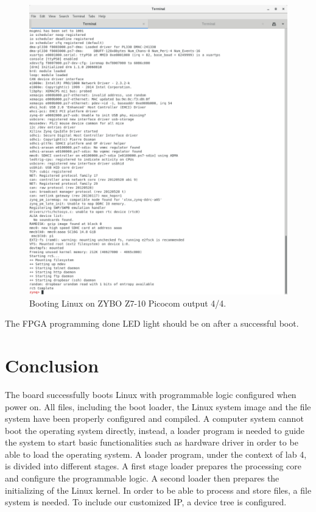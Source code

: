 \documentclass[11pt,letterpaper,titlepage]{article}
\begin{document}
\newpage

\begin{figure}[h!]
    \centering
    \includegraphics[width=\textwidth]{boot_4.png}
    \caption{Booting Linux on ZYBO Z7-10 Picocom output 4/4.}
\end{figure}

The FPGA programming done LED light should be on after a successful boot.

\newpage

\part{Conclusion}

The board successfully boots Linux with programmable logic configured when power on. All files, including the boot loader, the Linux system image and the file system have been properly configured and compiled. A computer system cannot boot the operating system directly, instead, a loader program is needed to guide the system to start basic functionalities such as hardware driver in order to be able to load the operating system. A loader program, under the context of lab 4, is divided into different stages. A first stage loader prepares the processing core and configure the programmable logic. A second loader then prepares the initializing of the Linux kernel. In order to be able to process and store files, a file system is needed. To include our customized IP, a device tree is configured.
\end{document}
